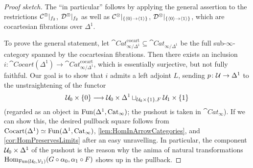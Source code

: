 \begin{proof}[Proof sketch]
	The \enquote{in particular} follows by applying the general assertion to the restrictions $\mathcal{C}^\otimes|_{f_2}$, $\mathcal{D}^\otimes|_{f_2}$ as well as $\mathcal{C}^\otimes|_{\{\langle 0\rangle \rightarrow \langle 1\rangle\}}$, $\mathcal{D}^\otimes|_{\{\langle 0\rangle \rightarrow \langle 1\rangle\}}$, which are cocartesian fibrations over $\Delta^1$.
	
	To prove the general statement, let $\cat{Cat}_{\infty/\Delta^1}^\mathrm{cocart}\subseteq \cat{Cat}_{\infty/\Delta^1}$ be the full sub-$\infty$-category spanned by the cocartesian fibrations. Then there exists an inclusion $i\colon \cat{Cocart}(\Delta^1)\rightarrow \cat{Cat}_{\infty/\Delta^1}^\mathrm{cocart}$, which is essentially surjective, but not fully faithful. Our goal is to show that $i$ admits a left adjoint $L$, sending $p\colon \mathcal{U}\rightarrow \Delta^1$ to the unstraightening of the functor
	\begin{equation*}
		\mathcal{U}_0\times\{0\}\longrightarrow \mathcal{U}_0\times\Delta^1\sqcup_{\mathcal{U}_0\times \{1\},F}\mathcal{U}_1\times \{1\}
	\end{equation*}
	(regarded as an object in $\operatorname{Fun}(\Delta^1,\mathrm{Cat}_\infty)$; the pushout is taken in $\cat{Cat}_\infty$). If we can show this, the desired pullback square follows from $\mathrm{Cocart}(\Delta^1)\simeq \operatorname{Fun}(\Delta^1,\mathrm{Cat}_\infty)$, \cref{lem:HomInArrowCategories}, and \cref{cor:HomPreservesLimits} after an easy unravelling. In particular, the component $\mathcal{U}_0\times \Delta^1$ of the pushout is the reason why the anima of natural transformations $\operatorname{Hom}_{\operatorname{Fun}(\mathcal{U}_0,\mathcal{V}_1)}(G\circ \alpha_0,\alpha_1\circ F)$ shows up in the pullback.
	

\end{proof}
